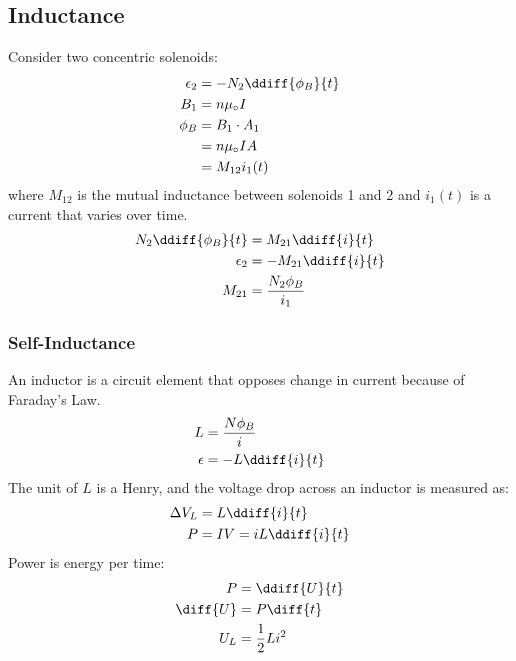 \documentclass{math}
\begin{document}
\subsection*{Inductance}
Consider two concentric solenoids:
\begin{align*}
  \epsilon_2 &= -N_2\ddiff{\phi_B}{t} \\
  B_1 &= n\mu_{\circ}I \\
  \phi_B &= B_1\cdot A_1 \\
  &= n\mu_{\circ}IA \\
  &= M_{12}i_1(t)
\end{align*}
where \( M_{12} \) is the mutual inductance between solenoids 1 and 2 and
\( i_1(t) \) is a current that varies over time.
\begin{align*}
  N_2\ddiff{\phi_B}{t} &= M_{21}\ddiff{i}{t} \\
  \epsilon_2 &= -M_{21}\ddiff{i}{t} \\
  M_{21} &= \frac{N_2\phi_B}{i_1}
\end{align*}

\subsubsection*{Self-Inductance}
An inductor is a circuit element that opposes change in current because of
Faraday's Law.
\begin{align*}
  L &= \frac{N\phi_B}{i} \\
  \epsilon &= -L\ddiff{i}{t}
\end{align*}
The unit of \( L \) is a Henry, and the voltage drop across an inductor is
measured as:
\begin{align*}
  \Delta V_L &= L\ddiff{i}{t} \\
  P &= IV = iL\ddiff{i}{t}
\end{align*}
Power is energy per time:
\begin{align*}
  P &= \ddiff{U}{t} \\
  \diff{U} &= P\diff{t} \\
  U_L &= \frac{1}{2}Li^2 \\
\end{align*}
\end{document}
